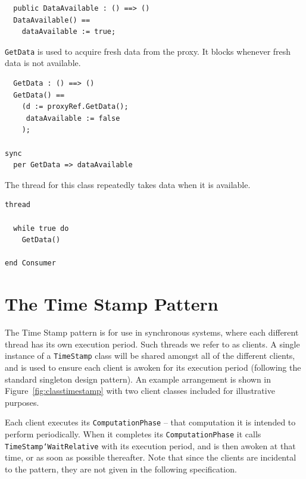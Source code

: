 \documentclass{overturerepchap}
\begin{document}
\begin{lstlisting}
  public DataAvailable : () ==> ()
  DataAvailable() ==
    dataAvailable := true;
\end{lstlisting}

\texttt{GetData} is used to acquire fresh data from the proxy. It
blocks whenever fresh data is not available.

\begin{lstlisting}
  GetData : () ==> ()
  GetData() ==
    (d := proxyRef.GetData();
     dataAvailable := false
    );

sync
  per GetData => dataAvailable
\end{lstlisting}

The thread for this class repeatedly takes data when it is available.

\begin{lstlisting}
thread

  while true do
    GetData()

end Consumer
\end{lstlisting}

\section{The Time Stamp Pattern}\label{sec:TimeStamp}

The Time Stamp pattern is for use in synchronous systems, where each
different thread has its own execution period. Such threads we refer
to as clients. 
A single instance of a
\texttt{TimeStamp} class will be shared amongst all of the different
clients, and is used to ensure each client is awoken for its execution
period (following the standard singleton design pattern). An example arrangement is shown in
Figure~\ref{fig:classtimestamp} with two client classes included for
illustrative purposes.

Each client executes its
\texttt{ComputationPhase} -- that computation it is intended to perform
periodically. When it completes its \texttt{ComputationPhase} it calls 
\texttt{TimeStamp`WaitRelative} with its
execution period, and is then awoken at that time, or as soon as
possible thereafter. Note that since the clients are incidental to the 
pattern, they are not given in the following specification.

\end{document}
